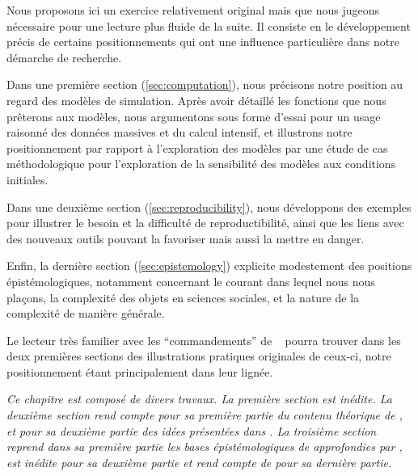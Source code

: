  
Nous proposons ici un exercice relativement original mais que nous jugeons nécessaire pour une lecture plus fluide de la suite. Il consiste en le développement précis de certains positionnements qui ont une influence particulière dans notre démarche de recherche. %

Dans une première section (\ref{sec:computation}), nous précisons notre position au regard des modèles de simulation. Après avoir détaillé les fonctions que nous prêterons aux modèles, nous argumentons sous forme d'essai pour un usage raisonné des données massives et du calcul intensif, et illustrons notre positionnement par rapport à l'exploration des modèles par une étude de cas méthodologique pour l'exploration de la sensibilité des modèles aux conditions initiales.

Dans une deuxième section (\ref{sec:reproducibility}), nous développons des exemples pour illustrer le besoin et la difficulté de reproductibilité, ainsi que les liens avec des nouveaux outils pouvant la favoriser mais aussi la mettre en danger.

Enfin, la dernière section (\ref{sec:epistemology}) explicite modestement des positions épistémologiques, notamment concernant le courant dans lequel nous nous plaçons, la complexité des objets en sciences sociales, et la nature de la complexité de manière générale. %

Le lecteur très familier avec les ``commandements'' de ~\cite{banos2013pour} pourra trouver dans les deux premières sections des illustrations pratiques originales de ceux-ci, notre positionnement étant principalement dans leur lignée.



\stars


\textit{Ce chapitre est composé de divers travaux. La première section est inédite. La deuxième section rend compte pour sa première partie du contenu théorique de \cite{raimbault2016cautious}, et pour sa deuxième partie des idées présentées dans \cite{cottineau2017initial}. La troisième section reprend dans sa première partie les bases épistémologiques de \cite{raimbault:halshs-01505084} approfondies par \cite{raimbault2017knowledge}, est inédite pour sa deuxième partie et rend compte de \cite{raimbault2017complex} pour sa dernière partie.
}






